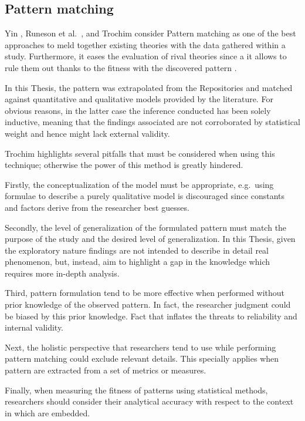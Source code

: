 \subsection{Pattern matching}
Yin \cite{case_study_guide}, Runeson et al.\ \cite{case_study_software_engineering}, and Trochim \cite{pattern_matching} consider Pattern matching as one of the best approaches to meld together existing theories with the data gathered within a study. Furthermore, it eases the evaluation of rival theories since a it allows to rule them out thanks to the fitness with the discovered pattern \cite{pattern_matching}.

In this Thesis, the pattern was extrapolated from the Repositories and matched against quantitative and qualitative models provided by the literature. For obvious reasons, in the latter case the inference conducted has been solely inductive, meaning that the findings associated are not corroborated by statistical weight and hence might lack external validity.

Trochim \cite{pattern_matching} highlights several pitfalls that must be considered when using this technique; otherwise the power of this method is greatly hindered.

Firstly, the conceptualization of the model must be appropriate, e.g.\ using formulae to describe a purely qualitative model is discouraged since constants and factors derive from the researcher best guesses.

Secondly, the level of generalization of the formulated pattern must match the purpose of the study and the desired level of generalization. In this Thesis, given the exploratory nature findings are not intended to describe in detail real phenomenon, but, instead, aim to highlight a gap in the knowledge which requires more in-depth analysis.

Third, pattern formulation tend to be more effective when performed without prior knowledge of the observed pattern. In fact, the researcher judgment could be biased by this prior knowledge. Fact that inflates the threats to reliability and internal validity.

Next, the holistic perspective that researchers tend to use while performing pattern matching could exclude relevant details. This specially applies when pattern are extracted from a set of metrics or measures.

Finally, when measuring the fitness of patterns using statistical methods, researchers should consider their analytical accuracy with respect to the context in which are embedded.


